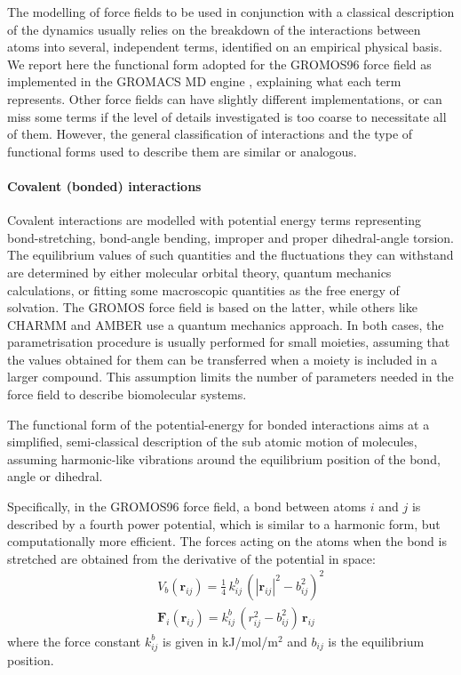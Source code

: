 The modelling of force fields to be used in conjunction with a classical description of the dynamics usually relies on the breakdown of the interactions between atoms into several, independent terms, identified on an empirical physical basis. We report here the functional form adopted for the GROMOS96 force field \cite{--} as implemented in the GROMACS MD engine \cite{--}, explaining what each term represents. Other force fields can have slightly different implementations, or can miss some terms if the level of details investigated is too coarse to necessitate all of them. However, the general classification of interactions and the type of functional forms used to describe them are similar or analogous.

\paragraph{Covalent (bonded) interactions} Covalent interactions are modelled with potential energy terms representing bond-stretching, bond-angle bending, improper and proper dihedral-angle torsion. The equilibrium values of such quantities and the fluctuations they can withstand are determined by either molecular orbital theory, quantum mechanics calculations, or fitting some macroscopic quantities as the free energy of solvation. The GROMOS force field is based on the latter, while others like CHARMM \cite{--} and AMBER \cite{--} use a quantum mechanics approach.
%
In both cases, the parametrisation procedure is usually performed for small moieties, assuming that the values obtained for them can be transferred when a moiety is included in a larger compound. This assumption limits the number of parameters needed in the force field to describe biomolecular systems.

The functional form of the potential-energy for bonded interactions aims at a simplified, semi-classical description of the sub atomic motion of molecules, assuming harmonic-like vibrations around the equilibrium position of the bond, angle or dihedral. 

Specifically, in the GROMOS96 force field, a bond between atoms $i$ and $j$ is described by a fourth power potential, which is similar to a harmonic form, but computationally more efficient. The forces acting on the atoms when the bond is stretched are obtained from the derivative of the potential in space:
\begin{eqnarray}
&& V_b(\textbf{r}_{ij}) = \frac{1}{4}\,k^b_{ij}\,\left(|\textbf{r}_{ij}|^2 - b_{ij}^2\right)^2 \\
&& \textbf{F}_i(\textbf{r}_{ij}) = k^b_{ij}\,\left(r_{ij}^2 - b_{ij}^2\right)\,\textbf{r}_{ij}
\end{eqnarray}
where the force constant $k^b_{ij}$ is given in kJ/mol/m$^2$ and $b_{ij}$ is the equilibrium position.

